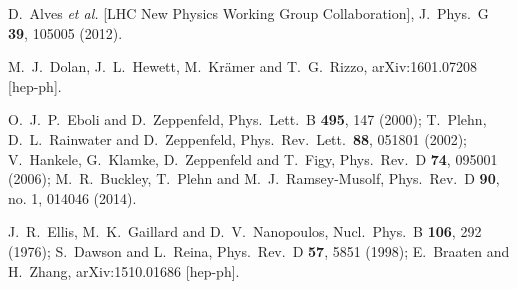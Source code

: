   D.~Alves {\it et al.} [LHC New Physics Working Group Collaboration],
  J.\ Phys.\ G {\bf 39}, 105005 (2012).

  M.~J.~Dolan, J.~L.~Hewett, M.~Kr\"{a}mer and T.~G.~Rizzo,
  arXiv:1601.07208 [hep-ph].

  O.~J.~P.~Eboli and D.~Zeppenfeld,
  Phys.\ Lett.\ B {\bf 495}, 147 (2000);
  T.~Plehn, D.~L.~Rainwater and D.~Zeppenfeld,
  Phys.\ Rev.\ Lett.\  {\bf 88}, 051801 (2002);
  V.~Hankele, G.~Klamke, D.~Zeppenfeld and T.~Figy,
  Phys.\ Rev.\ D {\bf 74}, 095001 (2006);
  M.~R.~Buckley, T.~Plehn and M.~J.~Ramsey-Musolf,
  Phys.\ Rev.\ D {\bf 90}, no. 1, 014046 (2014).

  J.~R.~Ellis, M.~K.~Gaillard and D.~V.~Nanopoulos,
  Nucl.\ Phys.\ B {\bf 106}, 292 (1976);
  S.~Dawson and L.~Reina,
  Phys.\ Rev.\ D {\bf 57}, 5851 (1998);
  E.~Braaten and H.~Zhang,
  arXiv:1510.01686 [hep-ph].
